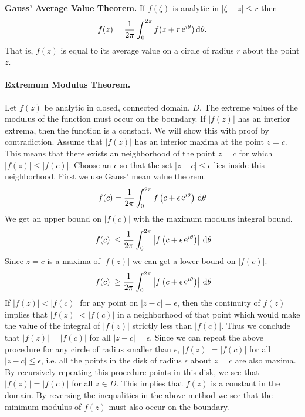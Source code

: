 \begin{Result}
  \label{gauss_average_value_theorem}
  \textbf{Gauss' Average Value Theorem.}
  If $f(\zeta)$ is analytic in $|\zeta - z| \leq r$ then
  \[
  f(z) = \frac{1}{2 \pi} \int_0^{2 \pi} f(z + r \mathop{\mathrm{e}}\nolimits^{\imath \theta})\,\mathrm{d} \theta.
  \]
  That is, $f(z)$ is equal to its average value on a circle of radius $r$
  about the point $z$.
\end{Result}







\paragraph{Extremum Modulus Theorem.}
Let $f(z)$ be analytic in closed, connected domain, $D$.  The extreme values
of the modulus of the function must occur on the boundary.  If $|f(z)|$ has
an interior extrema, then the function is a constant.  We will show this
with proof by contradiction.  Assume that $|f(z)|$ has an interior maxima at
the point $z = c$.  This means that there exists an neighborhood of the
point $z = c$ for which $|f(z)| \leq |f(c)|$.  Choose an $\epsilon$ so that
the set $|z - c| \leq \epsilon$ lies inside this neighborhood.  First we 
use Gauss' mean value theorem.
\[
f(c) = \frac{1}{2 \pi} \int_0^{2 \pi} f \left(c + \epsilon \mathop{\mathrm{e}}\nolimits^{\imath \theta} \right)\,\mathrm{d} \theta
\]
We get an upper bound on $|f(c)|$ with the maximum modulus integral bound.
\[
|f(c)| \leq \frac{1}{2 \pi} \int_0^{2 \pi} \left| 
  f \left(c + \epsilon \mathop{\mathrm{e}}\nolimits^{\imath \theta} \right) \right| \,\mathrm{d} \theta
\]
Since $z = c$ is a maxima of $|f(z)|$ we can get a lower bound on $|f(c)|$.
\[
|f(c)| \geq \frac{1}{2 \pi} \int_0^{2 \pi} \left| 
  f \left(c + \epsilon \mathop{\mathrm{e}}\nolimits^{\imath \theta} \right) \right| \,\mathrm{d} \theta
\]
If $|f(z)| < |f(c)|$ for any point on $|z - c| = \epsilon$, 
then the continuity of $f(z)$ 
implies that $|f(z)| < |f(c)|$ in a neighborhood of that point which would
make the value of the integral of $|f(z)|$ strictly less than $|f(c)|$.  Thus 
we conclude that $|f(z)| = |f(c)|$ for all $|z - c| = \epsilon$.  Since we
can repeat the above procedure for any circle of radius smaller than 
$\epsilon$, $|f(z)| = |f(c)|$ for all $|z - c| \leq \epsilon$, i.e. all the
points in the disk of radius $\epsilon$ about $z = c$ are also maxima.
By recursively repeating this procedure points in this disk, we see that
$|f(z)| = |f(c)|$ for all $z \in D$.    This implies that $f(z)$ is a constant
in the domain.  By reversing the inequalities in the above method we 
see that the minimum modulus of $f(z)$ must also occur on the boundary.





